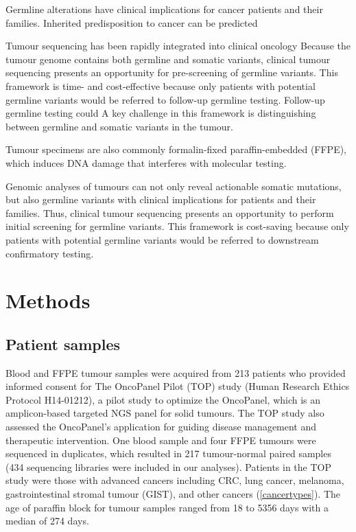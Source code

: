 \documentclass{bmcart}
\begin{document}
Germline alterations have clinical implications for cancer patients and their families. Inherited predisposition to cancer can be predicted

Tumour sequencing has been rapidly integrated into clinical oncology Because the tumour genome contains both germline and somatic variants, clinical tumour sequencing presents an opportunity for pre-screening of germline variants. This framework is time- and cost-effective because only patients with potential germline variants would be referred to follow-up germline testing. Follow-up germline testing could A key challenge in this framework is distinguishing between germline and somatic variants in the tumour.

Tumour specimens are also commonly formalin-fixed paraffin-embedded (FFPE), which induces DNA damage that interferes with molecular testing.

Genomic analyses of tumours can not only reveal actionable somatic mutations, but also germline variants with clinical implications for patients and their families. Thus, clinical tumour sequencing presents an opportunity to perform initial screening for germline variants. This framework is cost-saving because only patients with potential germline variants would be referred to downstream confirmatory testing.

\section*{Methods}

\subsection*{Patient samples}

Blood and FFPE tumour samples were acquired from 213 patients who provided informed consent for The OncoPanel Pilot (TOP) study (Human Research Ethics Protocol H14­-01212), a pilot study to optimize the OncoPanel, which is an amplicon-based targeted NGS panel for solid tumours. The TOP study also assessed the OncoPanel's application for guiding disease management and therapeutic intervention. One blood sample and four FFPE tumours were sequenced in duplicates, which resulted in 217 tumour-normal paired samples (434 sequencing libraries were included in our analyses). Patients in the TOP study were those with advanced cancers including CRC, lung cancer, melanoma, gastrointestinal stromal tumour (GIST), and other cancers (\autoref{cancertypes}). The age of paraffin block for tumour samples ranged from 18 to 5356 days with a median of 274 days.
\end{document}
